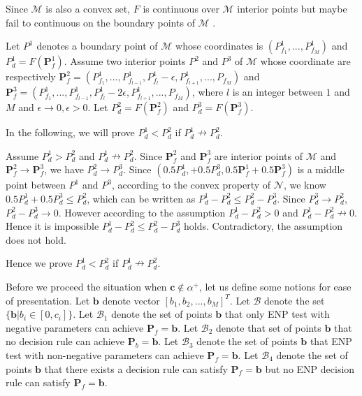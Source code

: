 \documentclass[12pt,journal,a4paper,twoside,onecolumn]{IEEEtran}
\begin{document}
\begin{spacing}{2.5}
Since $\mathcal{M}$ is also a convex set, $F$ is continuous over $\mathcal{M}$ interior points but maybe fail to continuous on the boundary points of $\mathcal{M}$ \cite{roberts1974convex}. 

Let $P^1$ denotes a boundary point of $\mathcal{M}$ whose coordinates is $(P_{f_1}^1, ..., P_{f_M}^1)$ and $P_d^1 = F(\mathbf{P}_{f}^1)$. Assume two interior points $P^2$ and $P^3$ of $\mathcal{M}$ whose coordinate are respectively $\mathbf{P}_{f}^2 = (P_{f_1}^1, ..., P_{f_{l-1}}^1, P_{f_l}^1 - \epsilon, P_{f_{l+1}}^1, ..., P_{f_M})$ and $\mathbf{P}_f^3 = (P_{f_1}^1, ..., P_{f_{l-1}}^1, P_{f_l}^1 - 2\epsilon, P_{f_{l+1}}^1, ..., P_{f_M})$, where $l$ is an integer between $1$ and $M$ and $\epsilon \rightarrow 0, \epsilon > 0$. Let $P_d^2 = F(\mathbf{P}_f^2)$ and $P_d^3 = F(\mathbf{P}_f^3)$. 

In the following, we will prove $P_d^1 < P_d^2$ if $P_d^1 \nrightarrow P_{d}^2$. 

Assume $P_d^1 > P_d^2$ and $P_d^1 \nrightarrow P_{d}^2$. Since $\mathbf{P}_{f}^2$ and $\mathbf{P}_{f}^3$ are interior points of $\mathcal{M}$ and $\mathbf{P}_{f}^2 \rightarrow \mathbf{P}_f^3$, we have $P_d^2 \rightarrow P_d^3$. Since $(0.5P_d^1, + 0.5P_d^3, 0.5\mathbf{P}_f^1 + 0.5\mathbf{P}_{f}^3)$ is a middle point between $P^1$ and $P^3$, according to the convex property of $\mathcal{N}$, we know $0.5P_d^1 + 0.5P_d^3 \leq P_d^2$, which can be written as $P_d^1 - P_d^2 \leq P_d^2 - P_d^3$. Since $P_d^3 \rightarrow P_d^2$, $P_d^2 - P_d^3 \rightarrow 0$. However according to the assumption $P_d^1 - P_d^2 > 0 $ and $P_d^1 - P_d^2 \nrightarrow 0$. Hence it is impossible   $P_d^1 - P_d^2 \leq P_d^2 - P_d^3$ holds.
Contradictory, the assumption does not hold. 

Hence we prove $P_d^1 < P_d^2 $ if $P_d^1 \nrightarrow P_{d}^2$. 

Before we proceed the situation when $\mathbf{c} \notin \alpha^+$, let us define some notions for ease of presentation. Let $\mathbf{b}$ denote vector $[b_1, b_2, ..., b_M]^T$.  
 Let $\mathcal{B}$ denote the set $\{ \mathbf{b} |  b_i \in [0, c_i] \}$. Let $\mathcal{B}_1$ denote the set of points $\mathbf{b}$ that only ENP test with negative parameters can achieve $\mathbf{P}_f = \mathbf{b}$. Let $\mathcal{B}_2$ denote that set of points $\mathbf{b}$ that no decision rule can achieve $\mathbf{P}_{b} = \mathbf{b}$. Let $\mathcal{B}_3$ denote the set of points $\mathbf{b}$ that ENP test with non-negative parameters can achieve $\mathbf{P}_f = \mathbf{b}$. Let $\mathcal{B}_4$ denote the set of points $\mathbf{b}$ that there exists a decision rule can satisfy $\mathbf{P}_f = \mathbf{b}$ but no ENP decision rule can satisfy $\mathbf{P}_f = \mathbf{b}$.


\end{spacing}
\end{document}
